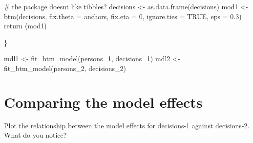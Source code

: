 \documentclass[
  letterpaper,
  DIV=11,
  numbers=noendperiod]{scrreprt}
\newenvironment{Shaded}{\begin{snugshade}}{\end{snugshade}}
\newcommand{\AttributeTok}[1]{\textcolor[rgb]{0.40,0.45,0.13}{#1}}
\newcommand{\CommentTok}[1]{\textcolor[rgb]{0.37,0.37,0.37}{#1}}
\newcommand{\ConstantTok}[1]{\textcolor[rgb]{0.56,0.35,0.01}{#1}}
\newcommand{\DecValTok}[1]{\textcolor[rgb]{0.68,0.00,0.00}{#1}}
\newcommand{\FloatTok}[1]{\textcolor[rgb]{0.68,0.00,0.00}{#1}}
\newcommand{\FunctionTok}[1]{\textcolor[rgb]{0.28,0.35,0.67}{#1}}
\newcommand{\NormalTok}[1]{\textcolor[rgb]{0.00,0.23,0.31}{#1}}
\newcommand{\OtherTok}[1]{\textcolor[rgb]{0.00,0.23,0.31}{#1}}
\begin{document}
\begin{Shaded}
\begin{Highlighting}[]
    \CommentTok{\# the package doesn\textquotesingle{}t like tibbles?}
\NormalTok{    decisions }\OtherTok{\textless{}{-}} \FunctionTok{as.data.frame}\NormalTok{(decisions)}
\NormalTok{    mod1 }\OtherTok{\textless{}{-}} \FunctionTok{btm}\NormalTok{(decisions, }\AttributeTok{fix.theta =}\NormalTok{ anchors, }\AttributeTok{fix.eta =} \DecValTok{0}\NormalTok{, }\AttributeTok{ignore.ties =} \ConstantTok{TRUE}\NormalTok{, }\AttributeTok{eps =} \FloatTok{0.3}\NormalTok{)}
    \FunctionTok{return}\NormalTok{ (mod1)}

\NormalTok{\}}

\NormalTok{mdl1 }\OtherTok{\textless{}{-}} \FunctionTok{fit\_btm\_model}\NormalTok{(persons\_1, decisions\_1)}
\NormalTok{mdl2 }\OtherTok{\textless{}{-}} \FunctionTok{fit\_btm\_model}\NormalTok{(persons\_2, decisions\_2)}
\end{Highlighting}
\end{Shaded}

\hypertarget{comparing-the-model-effects}{%
\section{Comparing the model
effects}\label{comparing-the-model-effects}}

Plot the relationship between the model effects for decisions-1 against
decisions-2. What do you notice?
\end{document}
